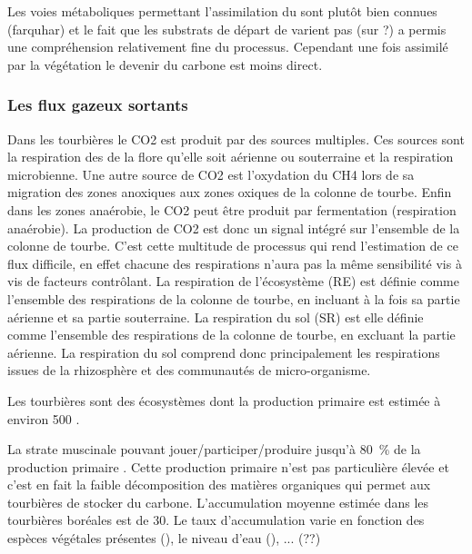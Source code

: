 Les voies métaboliques permettant l'assimilation du \COO sont plutôt bien connues (farquhar) et le fait que les substrats de départ de varient pas (sur ?) a permis une compréhension relativement fine du processus.
Cependant une fois assimilé par la végétation le devenir du carbone est moins direct.

\subsubsection{Les flux gazeux sortants}
Dans les tourbières le CO2 est produit par des sources multiples.
Ces sources sont la respiration des de la flore qu'elle soit aérienne ou souterraine et la respiration microbienne.
Une autre source de CO2 est l'oxydation du CH4 lors de sa migration des zones anoxiques aux zones oxiques de la colonne de tourbe.
Enfin dans les zones anaérobie, le CO2 peut être produit par fermentation (respiration anaérobie).
La production de CO2 est donc un signal intégré sur l'ensemble de la colonne de tourbe. 
C'est cette multitude de processus qui rend l'estimation de ce flux difficile, en effet chacune des respirations n'aura pas la même sensibilité vis à vis de facteurs contrôlant.
La respiration de l'écosystème (RE) est définie comme l'ensemble des respirations de la colonne de tourbe, en incluant à la fois sa partie aérienne et sa partie souterraine. 
La respiration du sol (SR) est elle définie comme l'ensemble des respirations de la colonne de tourbe, en excluant la partie aérienne.
La respiration du sol comprend donc principalement les respirations issues de la rhizosphère et des communautés de micro-organisme.

Les tourbières sont des écosystèmes dont la production primaire est estimée à environ \SI{500}{\gcm} \cite{francez2000}. 


La strate muscinale pouvant jouer/participer/produire jusqu'à \SI{80}{\percent} de la production primaire \cite{francez2000}.
Cette production primaire n'est pas particulière élevée \plop et c'est en fait la faible décomposition des matières organiques qui permet aux tourbières de stocker du carbone.
L'accumulation moyenne estimée dans les tourbières boréales est de \SI{30}{\gcm}. Le taux d'accumulation varie en fonction des espèces végétales présentes (\plop), le niveau d'eau (\plop), ... (??)



